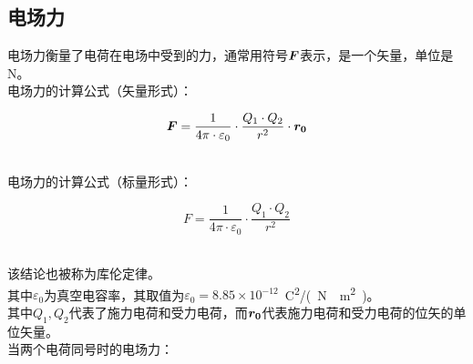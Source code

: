 \documentclass[UTF8]{ctexart}
\newcommand*{\veb}[1]{\vb*{#1}}
\begin{document}
\subsection{电场力}
    电场力衡量了电荷在电场中受到的力，通常用符号$\veb{F}$表示，是一个矢量，单位是\si{N}。\\[3mm]
    电场力的计算公式（矢量形式）：
    \begin{large}
        \begin{equation*}
            \veb{F}=\frac{1}{4\pi\cdot\varepsilon_0}\cdot\frac{Q_1\cdot Q_2}{r^2}\cdot\veb{r_0}
        \end{equation*}
    \end{large}\\
    电场力的计算公式（标量形式）：
    \begin{large}
        \begin{equation*}
            F=\frac{1}{4\pi\cdot\varepsilon_0}\cdot\frac{Q_1\cdot Q_2}{r^2}
        \end{equation*}
    \end{large}\\
    该结论也被称为库伦定律。\\[3mm]
    其中$\varepsilon_0$为真空电容率，其取值为$\varepsilon_0=8.85\times 10^{-12}$~\si{C^2/(N\cdot m^2)}。\\[3mm]
    其中$Q_1,Q_2$代表了施力电荷和受力电荷，而$\veb{r_0}$代表施力电荷和受力电荷的位矢的单位矢量。\\[6mm]
    当两个电荷同号时的电场力：
\end{document}
